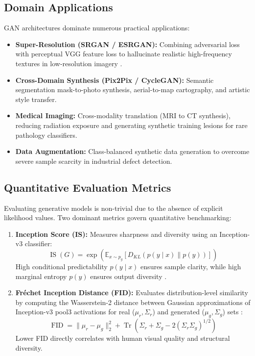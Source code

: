 \documentclass[conference]{IEEEtran}
\begin{document}
\subsection{Domain Applications}
GAN architectures dominate numerous practical applications:
\begin{itemize}
    \item \textbf{Super-Resolution (SRGAN / ESRGAN):} Combining adversarial loss with perceptual VGG feature loss to hallucinate realistic high-frequency textures in low-resolution imagery \cite{ledig2017photo}.
    \item \textbf{Cross-Domain Synthesis (Pix2Pix / CycleGAN):} Semantic segmentation mask-to-photo synthesis, aerial-to-map cartography, and artistic style transfer.
    \item \textbf{Medical Imaging:} Cross-modality translation (MRI to CT synthesis), reducing radiation exposure and generating synthetic training lesions for rare pathology classifiers.
    \item \textbf{Data Augmentation:} Class-balanced synthetic data generation to overcome severe sample scarcity in industrial defect detection.
\end{itemize}

\subsection{Quantitative Evaluation Metrics}
Evaluating generative models is non-trivial due to the absence of explicit likelihood values. Two dominant metrics govern quantitative benchmarking:
\begin{enumerate}
    \item \textbf{Inception Score (IS):} Measures sharpness and diversity using an Inception-v3 classifier:
    \begin{equation}
    \operatorname{IS}(G) = \exp\left( \mathbb{E}_{x \sim p_g} [D_{KL}(p(y \mid x) \parallel p(y))] \right)
    \end{equation}
    High conditional predictability $p(y \mid x)$ ensures sample clarity, while high marginal entropy $p(y)$ ensures output diversity \cite{salimans2016improved}.
    \item \textbf{Fr\'echet Inception Distance (FID):} Evaluates distribution-level similarity by computing the Wasserstein-2 distance between Gaussian approximations of Inception-v3 pool3 activations for real ($\mu_r, \Sigma_r$) and generated ($\mu_g, \Sigma_g$) sets \cite{heusel2017gans}:
    \begin{equation}
    \operatorname{FID} = \|\mu_r - \mu_g\|_2^2 + \operatorname{Tr}\left(\Sigma_r + \Sigma_g - 2(\Sigma_r \Sigma_g)^{1/2}\right)
    \label{eq:fid}
    \end{equation}
    Lower FID directly correlates with human visual quality and structural diversity.
\end{enumerate}
\end{document}
